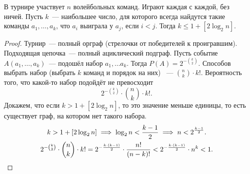 \begin{theorem}
   В турнире участвует $n$ волейбольных команд. Играют каждая с каждой, без ничей. Пусть $k$~--- наибольшее число, для которого всегда найдутся такие команды $a_1,\ldots, a_k$, что $a_i$ выиграла у $a_j$, если $i < j$. Тогда $k \leq 1 + [2\log_2{n}]$.

\end{theorem}
\begin{proof}
    Турнир~--- полный орграф (стрелочки от победителей к проигравшим). Подходящая цепочка~--- полный ациклический подграф. Пусть событие
    $A(a_1, \ldots, a_k)$~--- подошёл набор $a_1, \ldots a_k$. Тогда
    $P(A) = 2^{- {\binom{k}{2}}}$.
    Способов выбрать набор (выбрать $k$ команд и порядок на них) ~--- ${\binom{n}{k}} \cdot k!$.
Вероятность того, что какой-то набор подойдёт не превосходит
    $$2^{-{\binom{k}{2}}}\cdot \binom{n}{k}\cdot k!.$$
    Докажем, что если $k > 1 + [2\log_2{n}]$, то это значение меньше единицы, то есть существует граф, на котором нет такого набора. 
    \begin{gather*}
        k > 1 + [2\log_2{n}] \implies \log_2 n < \frac{k - 1}{2} \implies n < 2^{\frac{k-1}{2}}.\\
    2^{-{\binom{k}{2}}}\cdot {\binom{n}{k}}\cdot k! = 2^{-\frac{k \cdot (k-1)}{2}}\cdot \frac{n!}{(n-k)!}< 2^{-\frac{k \cdot (k-1)}{2}}\cdot n^k < 1.
    \end{gather*}
\end{proof}
